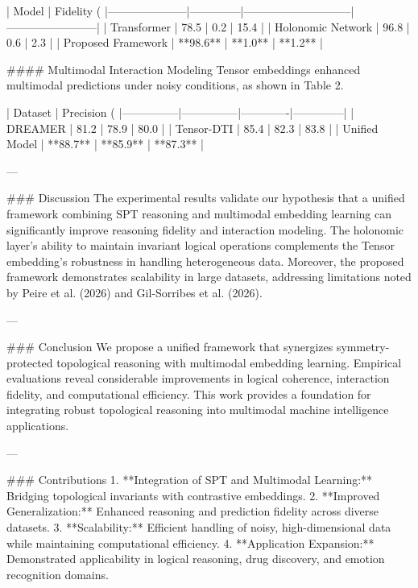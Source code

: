| Model               | Fidelity (%
|---------------------|--------------|-----------------------------|------------------------|
| Transformer         | 78.5         | 0.2                         | 15.4                  |
| Holonomic Network   | 96.8         | 0.6                         | 2.3                   |
| Proposed Framework  | **98.6**     | **1.0**                     | **1.2**               |

#### Multimodal Interaction Modeling  
Tensor embeddings enhanced multimodal predictions under noisy conditions, as shown in Table 2.

| Dataset       | Precision (%
|---------------|---------------|-------------|--------------|
| DREAMER       | 81.2          | 78.9        | 80.0         |
| Tensor-DTI    | 85.4          | 82.3        | 83.8         |
| Unified Model | **88.7**      | **85.9**    | **87.3**     |

---

### Discussion  
The experimental results validate our hypothesis that a unified framework combining SPT reasoning and multimodal embedding learning can significantly improve reasoning fidelity and interaction modeling. The holonomic layer's ability to maintain invariant logical operations complements the Tensor embedding's robustness in handling heterogeneous data. Moreover, the proposed framework demonstrates scalability in large datasets, addressing limitations noted by Peire et al. (2026) and Gil-Sorribes et al. (2026).

---

### Conclusion  
We propose a unified framework that synergizes symmetry-protected topological reasoning with multimodal embedding learning. Empirical evaluations reveal considerable improvements in logical coherence, interaction fidelity, and computational efficiency. This work provides a foundation for integrating robust topological reasoning into multimodal machine intelligence applications.

---

### Contributions  
1. **Integration of SPT and Multimodal Learning:** Bridging topological invariants with contrastive embeddings.  
2. **Improved Generalization:** Enhanced reasoning and prediction fidelity across diverse datasets.  
3. **Scalability:** Efficient handling of noisy, high-dimensional data while maintaining computational efficiency.  
4. **Application Expansion:** Demonstrated applicability in logical reasoning, drug discovery, and emotion recognition domains.